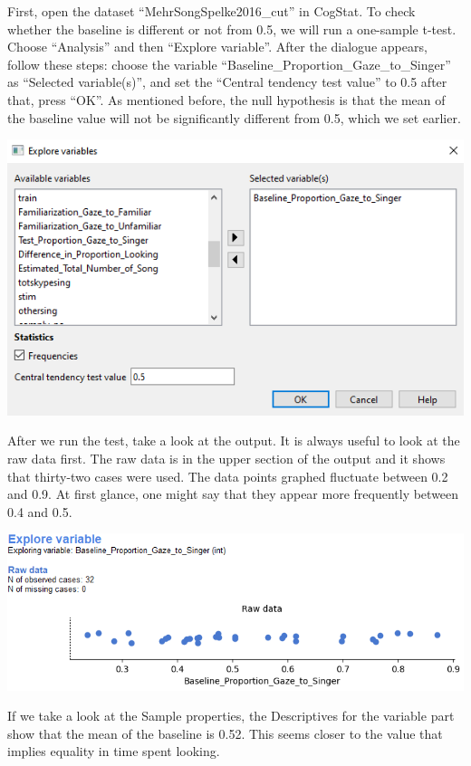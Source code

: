 \documentclass[
]{book}
\begin{document}
First, open the dataset ``MehrSongSpelke2016\_cut'' in CogStat. To check whether the baseline is different or not from 0.5, we will run a one-sample t-test. Choose ``Analysis'' and then ``Explore variable''. After the dialogue appears, follow these steps: choose the variable ``Baseline\_Proportion\_Gaze\_to\_Singer'' as ``Selected variable(s)'', and set the ``Central tendency test value'' to 0.5 after that, press ``OK''. As mentioned before, the null hypothesis is that the mean of the baseline value will not be significantly different from 0.5, which we set earlier.

\includegraphics{img/ch6/6.4expvarwindow.png}

After we run the test, take a look at the output. It is always useful to look at the raw data first. The raw data is in the upper section of the output and it shows that thirty-two cases were used. The data points graphed fluctuate between 0.2 and 0.9. At first glance, one might say that they appear more frequently between 0.4 and 0.5.

\includegraphics{img/ch6/6.4expvarraw.png}

If we take a look at the Sample properties, the Descriptives for the variable part show that the mean of the baseline is 0.52. This seems closer to the value that implies equality in time spent looking.
\end{document}
